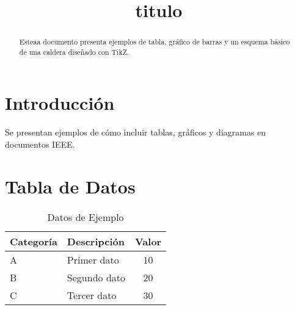 \documentclass[conference,12pt]{IEEEtran}
\title{titulo}
\author{}
\date{}
\begin{document}
\justifying
\begin{Form}
\maketitle
\tableofcontents



\begin{abstract}
Esteaa documento presenta ejemplos de tabla, gráfico de barras y un esquema básico de una caldera diseñado con TikZ.
\end{abstract}

\section{Introducción}
Se presentan ejemplos de cómo incluir tablas, gráficos y diagramas en documentos IEEE.
\misdatos





\section{Tabla de Datos}
\begin{table}[h]
    \centering
    \caption{Datos de Ejemplo}
    \begin{tabular}{@{}llc@{}}
        \toprule
        \textbf{Categoría} & \textbf{Descripción} & \textbf{Valor} \\ \midrule
        A & Primer dato  & 10 \\
        B & Segundo dato & 20 \\
        C & Tercer dato  & 30 \\
        \bottomrule
    \end{tabular}
    \label{tab:example}
\end{table}


\end{Form}
\end{document}
